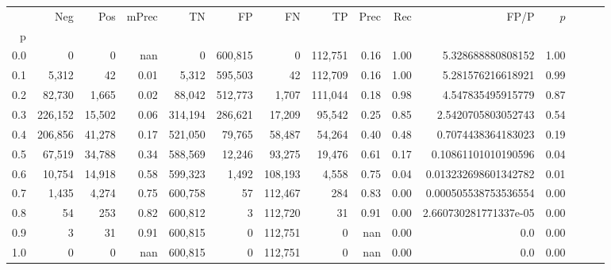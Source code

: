 \begin{tabular}{rrrrrrrrrrrrrrr}
\toprule
{} &      Neg &     Pos & mPrec &       TN &       FP &       FN &       TP &  Prec &   Rec &                   FP/P & $\hat{p}$ \\
p   &          &         &       &          &          &          &          &       &       &                        &           \\
\midrule
0.0 &        0 &       0 &   nan &        0 &  600,815 &        0 &  112,751 &  0.16 &  1.00 &      5.328688880808152 &      1.00 \\
0.1 &    5,312 &      42 &  0.01 &    5,312 &  595,503 &       42 &  112,709 &  0.16 &  1.00 &      5.281576216618921 &      0.99 \\
0.2 &   82,730 &   1,665 &  0.02 &   88,042 &  512,773 &    1,707 &  111,044 &  0.18 &  0.98 &      4.547835495915779 &      0.87 \\
0.3 &  226,152 &  15,502 &  0.06 &  314,194 &  286,621 &   17,209 &   95,542 &  0.25 &  0.85 &     2.5420705803052743 &      0.54 \\
0.4 &  206,856 &  41,278 &  0.17 &  521,050 &   79,765 &   58,487 &   54,264 &  0.40 &  0.48 &     0.7074438364183023 &      0.19 \\
0.5 &   67,519 &  34,788 &  0.34 &  588,569 &   12,246 &   93,275 &   19,476 &  0.61 &  0.17 &    0.10861101010190596 &      0.04 \\
0.6 &   10,754 &  14,918 &  0.58 &  599,323 &    1,492 &  108,193 &    4,558 &  0.75 &  0.04 &   0.013232698601342782 &      0.01 \\
0.7 &    1,435 &   4,274 &  0.75 &  600,758 &       57 &  112,467 &      284 &  0.83 &  0.00 &   0.000505538753536554 &      0.00 \\
0.8 &       54 &     253 &  0.82 &  600,812 &        3 &  112,720 &       31 &  0.91 &  0.00 &  2.660730281771337e-05 &      0.00 \\
0.9 &        3 &      31 &  0.91 &  600,815 &        0 &  112,751 &        0 &   nan &  0.00 &                    0.0 &      0.00 \\
1.0 &        0 &       0 &   nan &  600,815 &        0 &  112,751 &        0 &   nan &  0.00 &                    0.0 &      0.00 \\
\bottomrule
\end{tabular}

